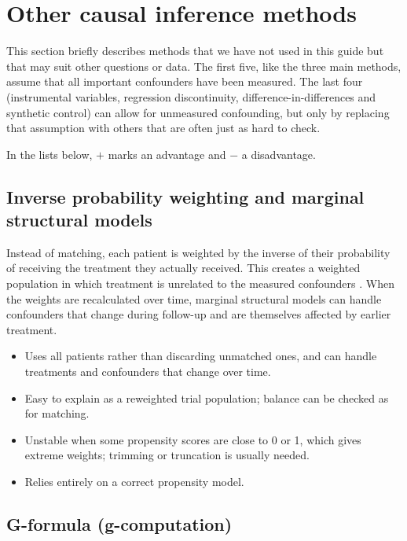 \section{Other causal inference methods}\label{sec:other_methods}

This section briefly describes methods that we have not used in this guide but that may suit other questions or data. The first five, like the three main methods, assume that all important confounders have been measured. The last four (instrumental variables, regression discontinuity, difference-in-differences and synthetic control) can allow for unmeasured confounding, but only by replacing that assumption with others that are often just as hard to check.

In the lists below, $+$ marks an advantage and $-$ a disadvantage.

\subsection{Inverse probability weighting and marginal structural models}

Instead of matching, each patient is weighted by the inverse of their probability of receiving the treatment they actually received. This creates a weighted population in which treatment is unrelated to the measured confounders \cite{robins2000msm,hernan2020whatif}. When the weights are recalculated over time, marginal structural models can handle confounders that change during follow-up and are themselves affected by earlier treatment.
\begin{itemize}
\item[$+$] Uses all patients rather than discarding unmatched ones, and can handle treatments and confounders that change over time.
\item[$+$] Easy to explain as a reweighted trial population; balance can be checked as for matching.
\item[$-$] Unstable when some propensity scores are close to 0 or 1, which gives extreme weights; trimming or truncation is usually needed.
\item[$-$] Relies entirely on a correct propensity model.
\end{itemize}

\subsection{G-formula (g-computation)}

